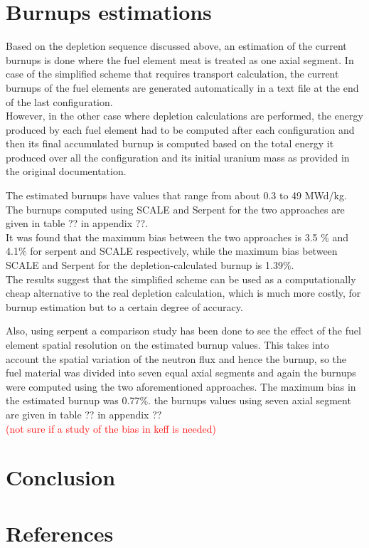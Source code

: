 \documentclass[review,number,sort&compress,12pt]{elsarticle}
\begin{document}
\section{Burnups estimations}
Based on the depletion sequence discussed above, an estimation of the current burnups is done where the fuel element meat is treated as one axial segment.
In case of the simplified scheme that requires transport calculation, the current burnups of the fuel elements are generated automatically in a text file at the end of the last configuration.\\
However, in the other case where depletion calculations are performed, the energy produced by each fuel element had to be computed after each configuration and then its final accumulated burnup is computed based on the total energy it produced over all the configuration and its initial uranium mass as provided in the original documentation.

The estimated burnups have values that range from about 0.3 to 49 MWd/kg. The burnups computed using SCALE and Serpent for the two approaches are given in table ?? in appendix ??.\\
It was found that the maximum bias between the two approaches is 3.5 \% and 4.1\% for serpent and SCALE respectively, while the maximum bias between SCALE and Serpent for the depletion-calculated burnup is 1.39\%.\\
The results suggest that the simplified scheme can be used as a computationally cheap alternative to the real depletion calculation, which is much more costly, for burnup estimation but to a certain degree of accuracy.

Also, using serpent a comparison study has been done to see the effect of the fuel element spatial resolution on the estimated burnup values. This takes into account the spatial variation of the neutron flux and hence the burnup, so the fuel material was divided into seven equal axial segments and again the burnups were computed using the two aforementioned approaches. 
The maximum bias in the estimated burnup was 0.77\%. the burnups values using seven axial segment are given in table ?? in appendix ??\\ 
\textcolor{red}{(not sure if a study of the bias in keff is needed)}


\section{Conclusion}

\section*{References}

 

\end{document}
